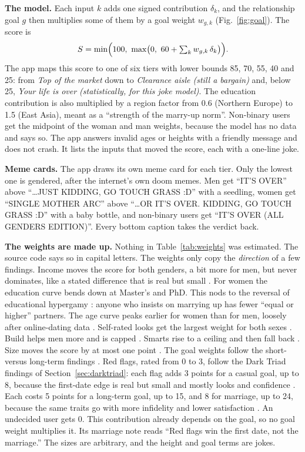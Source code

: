 \documentclass[conference,a4paper]{IEEEtran}
\begin{document}
\textbf{The model.} Each input $k$ adds one signed contribution $\delta_k$, and the relationship goal $g$ then multiplies some of them by a goal weight $w_{g,k}$ (Fig.~\ref{fig:goal}). The score is
\begin{equation}
S = \min\Bigl(100,\ \max\bigl(0,\ 60 + \textstyle\sum_k w_{g,k}\,\delta_k\bigr)\Bigr).
\end{equation}
The app maps this score to one of six tiers with lower bounds 85, 70, 55, 40 and 25: from \emph{Top of the market} down to \emph{Clearance aisle (still a bargain)} and, below 25, \emph{Your life is over (statistically, for this joke model)}. The education contribution is also multiplied by a region factor from 0.6 (Northern Europe) to 1.5 (East Asia), meant as a ``strength of the marry-up norm''. Non-binary users get the midpoint of the woman and man weights, because the model has no data and says so. The app answers invalid ages or heights with a friendly message and does not crash. It lists the inputs that moved the score, each with a one-line joke.

\textbf{Meme cards.} The app draws its own meme card for each tier. Only the lowest one is gendered, after the internet's own doom memes. Men get ``IT'S OVER'' above ``\ldots JUST KIDDING, GO TOUCH GRASS :D'' with a seedling, women get ``SINGLE MOTHER ARC'' above ``\ldots OR IT'S OVER. KIDDING, GO TOUCH GRASS :D'' with a baby bottle, and non-binary users get ``IT'S OVER (ALL GENDERS EDITION)''. Every bottom caption takes the verdict back.

\textbf{The weights are made up.} Nothing in Table~\ref{tab:weights} was estimated. The source code says so in capital letters. The weights only copy the \emph{direction} of a few findings. Income moves the score for both genders, a bit more for men, but never dominates, like a stated difference that is real but small \cite{buss1989,eastwick2008}. For women the education curve bends down at Master's and PhD. This nods to the reversal of educational hypergamy \cite{esteve2016}: anyone who insists on marrying up has fewer ``equal or higher'' partners. The age curve peaks earlier for women than for men, loosely after online-dating data \cite{bruch2018}. Self-rated looks get the largest weight for both sexes \cite{eastwick2014,hitsch2010qme}. Build helps men more and is capped \cite{sell2017}. Smarts rise to a ceiling and then fall back \cite{gignac2019}. Size moves the score by at most one point \cite{mautz2013,lever2006}. The goal weights follow the short- versus long-term findings \cite{kenrick1990,likenrick2006}. Red flags, rated from 0 to 3, follow the Dark Triad findings of Section~\ref{sec:darktriad}: each flag adds 3 points for a casual goal, up to 8, because the first-date edge is real but small and mostly looks and confidence \cite{jauk2016,dufner2013}. Each costs 5 points for a long-term goal, up to 15, and 8 for marriage, up to 24, because the same traits go with more infidelity and lower satisfaction \cite{ataman2025,kardum2024}. An undecided user gets 0. This contribution already depends on the goal, so no goal weight multiplies it. Its marriage note reads ``Red flags win the first date, not the marriage.'' The sizes are arbitrary, and the height and goal terms are jokes.
\end{document}
